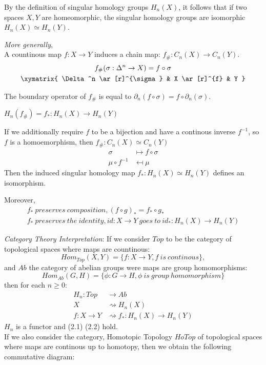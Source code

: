 \documentclass[11pt,a4paper]{report}
\begin{document}
    By the definition of singular homology groups $H_n(X)$, it follows that if two spaces $X, Y$ are homeomorphic, the singular homology groups are isomorphic $ H_n(X) \simeq H_n(Y)$.
    
    \emph{More generally}, \\
    A countinous map $f: X \rightarrow Y$ induces a chain map: $f_\#: C_n(X) \rightarrow C_n(Y)$.
    \begin{gather*}
        f_\#(\sigma: \Delta^ n \rightarrow X) = f \circ \sigma \\
                    \xymatrix{
                        \Delta^n  \ar[r]^{\sigma} & 
                        X  \ar[r]^{f} & Y  }
    \end{gather*}
    
    The boundary operator of $f_\#$ is equal to $\partial_n(f \circ \sigma) = f \circ \partial_n(\sigma)$. 
    
    $H_n(f_\#) = f_*: H_n(X) \rightarrow H_n(Y)$ \\
    
    \par
    If we additionally require $f$ to be a bijection and have a continous inverse $f^{-1}$, so $f$ is a homoemorphism, then $f_\#: C_n(X) \simeq C_n(Y)$
    \begin{align*}
        \sigma &\mapsto f \circ \sigma \\
        \mu \circ f^{-1} &\mapsfrom \mu  
    \end{align*}
    Then the induced singular homology map $f_*: H_n(X) \simeq H_n(Y)$ defines an isomorphism.
    
    Moreover,
    \begin{gather}
        f_* \ preserves \ composition, (f \circ g)_* = f_* \circ g_* \\
        f_* \ preserves \ the \ identity, id: X \rightarrow Y \ goes \ to \ id_*:  H_n(X) \rightarrow H_n(Y)
    \end{gather}
    
    \emph{Category Theory Interpretation}: If we consider $Top$ to be the category of topological spaces where maps are countinous:
    \[{Hom}_{Top}(X, Y) = \{f: X \rightarrow Y, f \ is \ continous\},\] and $Ab$ the category of abelian groups were maps are group homomorphisms: \[{Hom}_{Ab}(G, H) = \{\phi: G \rightarrow H, \phi \ is \ group \ homomorphism\}\] then for each $n \geq 0$: 
     \begin{align*}
        H_n: Top &\rightarrow Ab \\
            X &\rightsquigarrow H_n(X) \\
        f: X \rightarrow Y &\rightsquigarrow f_*:  H_n(X) \rightarrow H_n(Y) 
    \end{align*}
    $H_n$ is a functor and (2.1) (2.2) hold.  \\
    If we also consider the category, Homotopic Topology $HoTop$ of topological spaces where maps are continous up to homotopy, then we obtain the following commutative diagram: 
    
\end{document}
